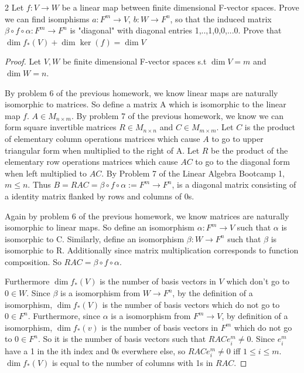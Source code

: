\documentclass{article}
\newcommand{\rarr}[0]{\rightarrow}
\begin{document}
\begin{PROB}{2}\label{Problem 2.}
	Let $f: V \rarr W$ be a linear map between finite dimensional F-vector spaces. Prove we can find isomphisms  $a: F^m \rarr V$, $b: W \rarr F^n$, so that the induced matrix $\beta \circ f \circ \alpha: F^m \rarr F^n$ is "diagonal" with diagonal entries 1,..,1,0,0,...0. Prove that $\dim f_*(V) + \dim \ker(f) = \dim V$
\end{PROB}
\begin{proof}

	Let $V, W$ be finite dimensional F-vector spaces s.t $\dim V = m$ and $\dim W = n$.

	By problem 6 of the previous homework, we know linear maps are naturally isomorphic to matrices. So define a matrix A which is isomorphic to the linear map $f$. $A \in M_{n \times m}$. By problem 7 of the previous homework, we know we can form square invertible matrices $R \in M_{n \times n}$ and $C \in M_{m \times m}$. Let $C$ is the product of elementary column operations matrices which cause $A$ to go to upper triangular form when multiplied to the right of A. Let $R$ be the product of the elementary row operations matrices which cause $AC$ to go to the diagonal form when left multiplied to $AC$. By Problem 7 of the Linear Algebra Bootcamp 1, $m \leq n$. Thus $B = RAC = \beta \circ f \circ \alpha := F^m \rarr F^n$, is a diagonal matrix consisting of a identity matrix flanked by rows and columns of 0s.


	Again by problem 6 of the previous homework, we know matrices are naturally isomorphic to linear maps. So define an isomorphism $\alpha: F^m \rarr V$ such that $\alpha$ is isomorphic to C. Similarly, define an isomorphism $\beta: W \rarr F^n$ such that $\beta$ is isomorphic to R. Additionally since matrix multiplication corresponds to function composition. So $RAC = \beta \circ f \circ \alpha$. 

	Furthermore $\dim f_*(V)$ is the number of basis vectors in $V$ which don't go to $0 \in W$. Since $\beta$ is a isomorphism from $W \rarr F^n$, by the definition of a isomorphism, $\dim f_*(V)$ is the number of basis vectors which do not go to $0 \in F^n$. Furthermore, since $\alpha$ is a isomorphism from $F^m \rarr V$, by definition of a isomorphism, $\dim f_*(v)$ is the number of basis vectors in $F^m$ which do not go to $0 \in F^n$. So it is the number of basis vectors such that $RACe^m_i \neq 0$. Since $e^m_i$ have a 1 in the ith index and 0s everwhere else, so $RACe^m_i \neq 0$ iff $1 \leq i \leq m$. $\dim f_*(V)$ is equal to the number of columns with 1s in $RAC$. 


\end{proof}
\end{document}
